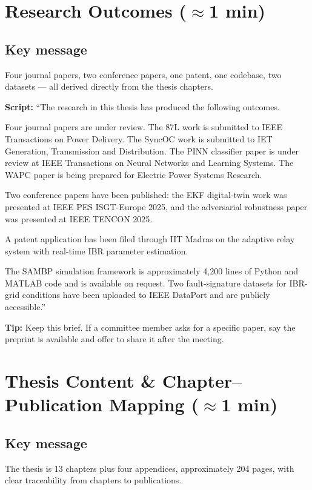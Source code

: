 \documentclass[11pt,a4paper]{article}
\newcommand{\script}[1]{\begin{scriptbox}\textbf{Script:} #1\end{scriptbox}}
\newcommand{\tip}[1]{\begin{tipbox}\textbf{Tip:} #1\end{tipbox}}
\begin{document}
\section{Research Outcomes \hfill\normalfont\small($\approx$1 min)}
\label{slide:outcomes}

\subsection*{Key message}
Four journal papers, two conference papers, one patent, one codebase, two datasets —
all derived directly from the thesis chapters.

\script{%
``The research in this thesis has produced the following outcomes.

Four journal papers are under review. The 87L work is submitted to IEEE Transactions on
Power Delivery. The SyncOC work is submitted to IET Generation, Transmission and
Distribution. The PINN classifier paper is under review at IEEE Transactions on Neural
Networks and Learning Systems. The WAPC paper is being prepared for Electric Power Systems
Research.

Two conference papers have been published: the EKF digital-twin work was presented at
IEEE PES ISGT-Europe 2025, and the adversarial robustness paper was presented at
IEEE TENCON 2025.

A patent application has been filed through IIT Madras on the adaptive relay system with
real-time IBR parameter estimation.

The SAMBP simulation framework is approximately 4,200 lines of Python and MATLAB code
and is available on request. Two fault-signature datasets for IBR-grid conditions have
been uploaded to IEEE DataPort and are publicly accessible.''%
}

\tip{Keep this brief. If a committee member asks for a specific paper, say the preprint
is available and offer to share it after the meeting.}

\section{Thesis Content \& Chapter--Publication Mapping \hfill\normalfont\small($\approx$1 min)}
\label{slide:content}

\subsection*{Key message}
The thesis is 13 chapters plus four appendices, approximately 204 pages, with clear
traceability from chapters to publications.
\end{document}

